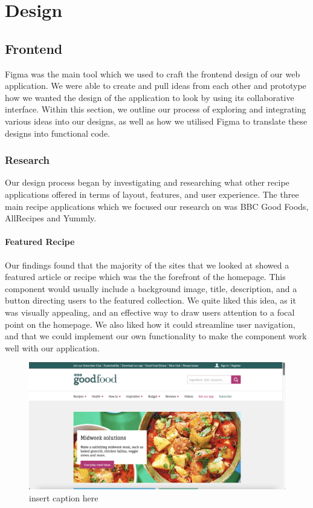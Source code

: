 \documentclass{article}
\begin{document}
    \section{Design}
    \subsection{Frontend}
    Figma was the main tool which we used to craft the frontend design of our web application. We were able to create and pull ideas from each other and prototype how we wanted the design of the application to look by using its collaborative interface. Within this section, we outline our process of exploring and integrating various ideas into our designs, as well as how we utilised Figma to translate these designs into functional code.

    \subsubsection{Research}
    
    Our design process began by investigating and researching what other recipe applications offered in terms of layout, features, and user experience. The three main recipe applications which we focused our research on was BBC Good Foods, AllRecipes and Yummly. 
    
    \paragraph{Featured Recipe}
    Our findings found that the majority of the sites that we looked at showed a featured article or recipe which was the the forefront of the homepage. This component would usually include a background image, title, description, and a button directing users to the featured collection. We quite liked this idea, as it was visually appealing, and an effective way to draw users attention to a focal point on the homepage. We also liked how it could streamline user navigation, and that we could implement our own functionality to make the component work well with our application.
    
    \begin{figure}[htbp]
      \includegraphics[width=1.0\textwidth]{BBCGF featured-image.png}
      \centering
      \caption{insert caption here}
    \end{figure}
\end{document}
